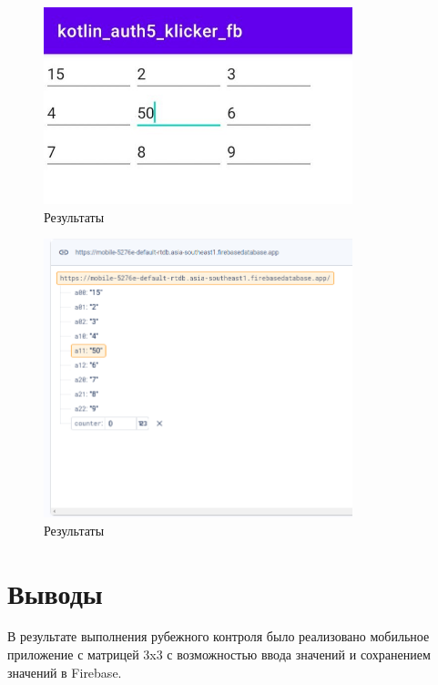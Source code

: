 \documentclass[a4paper, 14pt]{extarticle}
\begin{document}
\begin{figure}[!htb]
	\centering
	\includegraphics[width=0.8\textwidth]{img4}
\caption{Результаты}
\label{fig:img4}
\end{figure}

\begin{figure}[!htb]
	\centering
	\includegraphics[width=0.8\textwidth]{img5}
\caption{Результаты}
\label{fig:img5}
\end{figure}

\section{Выводы}\label{Sect::conclusion}

В результате выполнения рубежного контроля было реализовано мобильное приложение с матрицей 3x3 с возможностью ввода значений и сохранением значений в Firebase.
\end{document}
